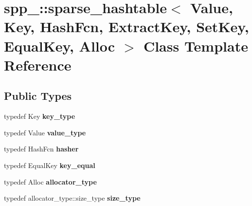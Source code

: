 \hypertarget{classspp___1_1sparse__hashtable}{}\section{spp\+\_\+\+:\+:sparse\+\_\+hashtable$<$ Value, Key, Hash\+Fcn, Extract\+Key, Set\+Key, Equal\+Key, Alloc $>$ Class Template Reference}
\label{classspp___1_1sparse__hashtable}
\subsection*{Public Types}
\begin{DoxyCompactItemize}
\item 
typedef Key {\bfseries key\+\_\+type}\hypertarget{classspp___1_1sparse__hashtable_ac8672625819f7514422e40b9f8988156}{}\label{classspp___1_1sparse__hashtable_ac8672625819f7514422e40b9f8988156}

\item 
typedef Value {\bfseries value\+\_\+type}\hypertarget{classspp___1_1sparse__hashtable_a72e9ee551b0204f2345549815f5b86fb}{}\label{classspp___1_1sparse__hashtable_a72e9ee551b0204f2345549815f5b86fb}

\item 
typedef Hash\+Fcn {\bfseries hasher}\hypertarget{classspp___1_1sparse__hashtable_a6dc8d6a9dded92ff9a0efce8312ed88d}{}\label{classspp___1_1sparse__hashtable_a6dc8d6a9dded92ff9a0efce8312ed88d}

\item 
typedef Equal\+Key {\bfseries key\+\_\+equal}\hypertarget{classspp___1_1sparse__hashtable_a3e8202c216185434acb21bb25bdee869}{}\label{classspp___1_1sparse__hashtable_a3e8202c216185434acb21bb25bdee869}

\item 
typedef Alloc {\bfseries allocator\+\_\+type}\hypertarget{classspp___1_1sparse__hashtable_a4f45afd46269e5a8d640a9c397172f7a}{}\label{classspp___1_1sparse__hashtable_a4f45afd46269e5a8d640a9c397172f7a}

\item 
typedef allocator\+\_\+type\+::size\+\_\+type {\bfseries size\+\_\+type}\hypertarget{classspp___1_1sparse__hashtable_a47ad0b40c6df47e02edfafdd38809368}{}\label{classspp___1_1sparse__hashtable_a47ad0b40c6df47e02edfafdd38809368}


\end{DoxyCompactItemize}
